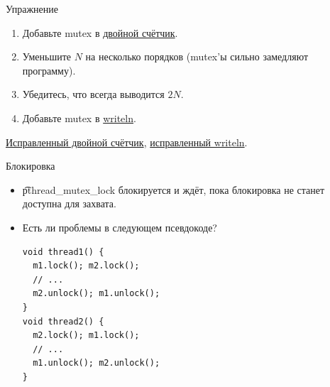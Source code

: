 \begin{frame}{Упражнение}
	\begin{enumerate}
		\item Добавьте mutex в \href{https://github.com/yeputons/fall-2016-paradigms/raw/master/161019/sources/08-two-threads.c}{двойной счётчик}.
		\item Уменьшите $N$ на несколько порядков (mutex'ы сильно замедляют программу).
		\item Убедитесь, что всегда выводится $2N$.
		\item Добавьте mutex в \href{https://github.com/yeputons/fall-2016-paradigms/raw/master/161019/sources/04-writeln-race.c}{writeln}.
	\end{enumerate}
	\href{https://github.com/yeputons/fall-2016-paradigms/raw/master/161019/sources/10-two-threads-good-mutex.c}{Исправленный двойной счётчик},
	\href{https://github.com/yeputons/fall-2016-paradigms/raw/master/161019/sources/11-writeln-mutex.c}{исправленный writeln}.
\end{frame}

\begin{frame}[fragile]{Блокировка}
	\begin{itemize}
		\item \t{pthread\_mutex\_lock} блокируется и ждёт, пока блокировка не станет доступна для захвата.
		\item Есть ли проблемы в следующем псевдокоде?
\begin{verbatim}
void thread1() {
  m1.lock(); m2.lock();
  // ...
  m2.unlock(); m1.unlock();
}
void thread2() {
  m2.lock(); m1.lock();
  // ...
  m1.unlock(); m2.unlock();
}
\end{verbatim}
	\end{itemize}
\end{frame}

